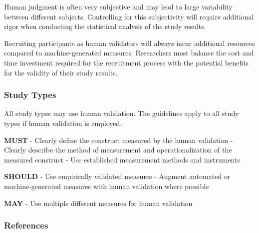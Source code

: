 \documentclass[11pt]{article}
\begin{document}
Human judgment is often very subjective and may lead to large variability between different subjects.
Controlling for this subjectivity will require additional rigor when conducting the statistical analysis of the study results.

Recruiting participants as human validators will always incur additional resources compared to machine-generated measures.
Researchers must balance the cost and time investment required for the recruitment process with the potential benefits for the validity of their study results.

\subsubsection{Study Types}

All study types may use human validation.
The guidelines apply to all study types if human validation is employed.

\textbf{MUST}
- Clearly define the construct measured by the human validation
- Clearly describe the method of measurement and operationalization of the measured construct
- Use established measurement methods and instruments

\textbf{SHOULD}
- Use empirically validated measures
- Augment automated or machine-generated measures with human validation where possible

\textbf{MAY}
- Use multiple different measures for human validation


\subsubsection{References}



\end{document}

